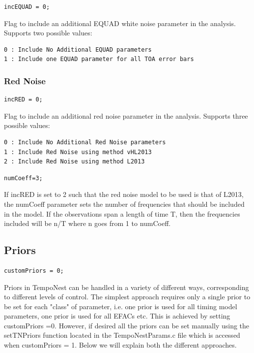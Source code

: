 \documentclass[%
 preprint,
 amsmath,amssymb,amsfonts,
 aps,
]{revtex4-1}
\begin{document}
\begin{lstlisting}
incEQUAD = 0;
\end{lstlisting}

Flag to include an additional EQUAD white noise parameter in the analysis.  Supports two possible values:

\begin{lstlisting}
0 : Include No Additional EQUAD parameters 
1 : Include one EQUAD parameter for all TOA error bars
\end{lstlisting}

\subsubsection{Red Noise}

\begin{lstlisting}
incRED = 0;
\end{lstlisting}

Flag to include an additional red noise parameter in the analysis.  Supports three possible values:

\begin{lstlisting}
0 : Include No Additional Red Noise parameters 
1 : Include Red Noise using method vHL2013
2 : Include Red Noise using method L2013
\end{lstlisting}

\begin{lstlisting}
numCoeff=3;
\end{lstlisting}
%
If incRED is set to 2 such that the red noise model to be used is that of L2013, the numCoeff parameter sets the number of frequencies that should be included in the model.  If the observations span a length of time T, then the frequencies included will be n/T where n goes from 1 to numCoeff.

\subsection{Priors}

\begin{lstlisting}
customPriors = 0;
\end{lstlisting}

Priors in TempoNest can be handled in a variety of different ways, corresponding to different levels of control.  The simplest approach requires only a single prior to be set for each "class" of parameter, i.e. one prior is used for all timing model parameters, one prior is used for all EFACs etc.  This is achieved by setting customPriors =0.   However, if desired all the priors can be set manually using the setTNPriors function located in the TempoNestParams.c file which is accessed when customPriors = 1.  Below we will explain both the different approaches.
\end{document}
